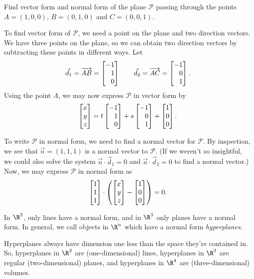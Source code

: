 \begin{example}
	Find vector form and normal form of the plane $\mathcal P$ passing
	through the points $A=(1,0,0)$, $B=(0,1,0)$ and $C=(0,0,1)$.

	To find vector form of $\mathcal P$, we need a point on the plane and
	two direction vectors.  We have three points on the plane, so we can
	obtain two direction vectors by subtracting these points in different ways.
	Let
	\[
		\vec d_1=\overrightarrow{AB} = \mat{-1\\1\\0}\qquad\vec d_2=\overrightarrow{AC}=
		\mat{-1\\0\\1}.
	\]
	Using the point $A$, we may now express $\mathcal P$ in vector form by
	\[
		\mat{x\\y\\z} = t\mat{-1\\1\\0}+s\mat{-1\\0\\1}+\mat{1\\0\\0}.
	\]

	To write $\mathcal P$ in normal form, we need to find a normal vector for $\mathcal P$.  By inspection,
	we see that $\vec n=(1,1,1)$ is a normal vector to $\mathcal P$.  (If we weren't
	so insightful, we could also solve the system $\vec n\cdot \vec d_1=0$ and $\vec n\cdot\vec d_2=0$ to find a
	normal vector.)  Now, we may express $\mathcal P$ in normal form as
	\[
		\mat{1\\1\\1}\cdot\left(\mat{x\\y\\z}-\mat{1\\0\\0}\right)=0.
	\]
\end{example}

In $\R^2$, only lines have a normal form, and in $\R^3$ only planes have a normal form. In general,
we call objects in $\R^n$ which have a normal form \emph{hyperplanes}.


Hyperplanes always have dimension one less than the space they're contained in. So, hyperplanes in
$\R^2$ are (one-dimensional) lines, hyperplanes in $\R^3$ are regular (two-dimensional) planes,
and hyperplanes in $\R^4$ are (three-dimensional) volumes.


